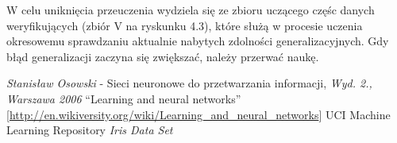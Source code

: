 \documentclass{classrep}
\begin{document}
W celu uniknięcia przeuczenia wydziela się ze zbioru uczącego częśc danych weryfikujących (zbiór V na ryskunku 4.3), które służą w procesie uczenia okresowemu sprawdzaniu aktualnie nabytych zdolności generalizacyjnych. Gdy błąd generalizacji zaczyna się zwiększać, należy przerwać naukę.


\clearpage

\begin{thebibliography}{0}
   \textsl{Stanisław Osowski} - Sieci neuronowe do przetwarzania informacji, \textsl{Wyd. 2., Warszawa 2006}
   ``Learning and neural networks'' [\url{http://en.wikiversity.org/wiki/Learning_and_neural_networks}]
   UCI Machine Learning Repository \textsl{Iris Data Set}
\end{thebibliography}
\end{document}

